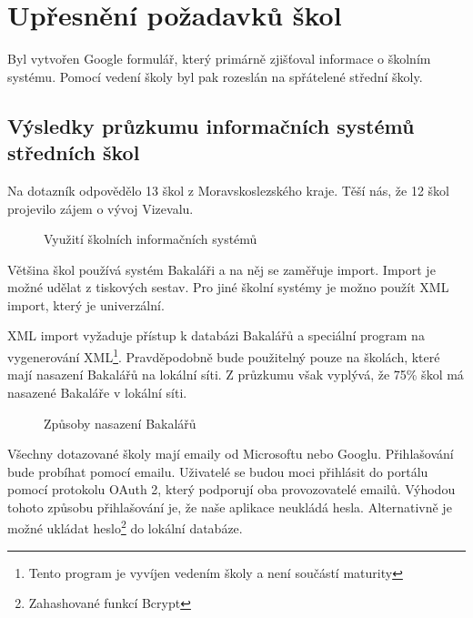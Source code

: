 \newpage
\section{Upřesnění požadavků škol}
Byl vytvořen Google formulář, který primárně zjišťoval informace o školním systému. Pomocí vedení školy byl pak rozeslán na spřátelené střední školy. 
\subsection{Výsledky průzkumu informačních systémů středních škol}
Na dotazník odpovědělo 13 škol z Moravskoslezského kraje. Těší nás, že 12 škol projevilo zájem o vývoj Vizevalu.

\begin{figure}[H]
    \centering
    \caption{Využití školních informačních systémů}
    \label{fig:vyuziti-skolnich-systemu}
\end{figure}

Většina škol používá systém Bakaláři a na něj se zaměřuje import. Import je možné udělat z tiskových sestav. Pro jiné školní systémy je možno použít XML import, který je univerzální.

XML import vyžaduje přístup k databázi Bakalářů a speciální program na vygenerování XML\footnote{Tento program je vyvíjen vedením školy a není součástí maturity}. Pravděpodobně bude použitelný pouze na školách, které mají nasazení Bakalářů na lokální síti.
Z průzkumu však vyplývá, že 75\% škol má nasazené Bakaláře v lokální síti.

\begin{figure}[H]
    \centering

    \caption{Způsoby nasazení Bakalářů}
    \label{fig:poskytovatele-emailu}
\end{figure}

Všechny dotazované školy mají emaily od Microsoftu nebo Googlu.
Přihlašování bude probíhat pomocí emailu.
Uživatelé se budou moci přihlásit do portálu pomocí protokolu OAuth 2, který podporují oba provozovatelé emailů.
Výhodou tohoto způsobu přihlašování je, že naše aplikace neukládá hesla.
Alternativně je možné ukládat heslo\footnote{Zahashované funkcí Bcrypt} do lokální databáze.



